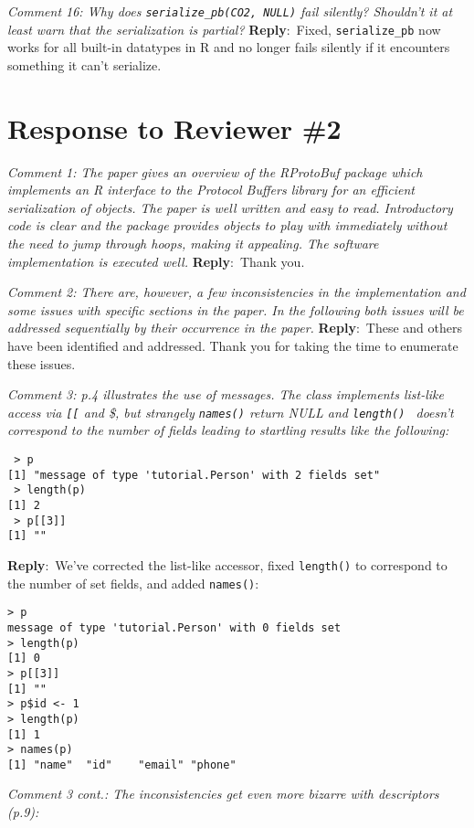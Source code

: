 \documentclass[10pt]{article}
\newcommand{\pointRaised}[2]{\smallskip %
  \textsl{{\fontseries{b}\selectfont #1}: #2}\newline}
\newcommand{\reply}[1]{\textbf{Reply}:\ #1 \smallskip } %
\begin{document}
\pointRaised{Comment 16}{Why does \texttt{serialize\_pb(CO2, NULL)} fail silently? Shouldn't it at least
   warn that the serialization is partial?}
\reply{Fixed, \texttt{serialize\_pb} now works for all built-in datatypes in R
  and no longer fails silently if it encounters something it can't serialize.}

\section*{Response to Reviewer \#2}

\pointRaised{Comment 1}{The paper gives an overview of the RProtoBuf package which implements an 
  R interface to the Protocol Buffers library for an efficient 
  serialization of objects. The paper is well written and easy to read. 
  Introductory code is clear and the package provides objects to play with 
  immediately without the need to jump through hoops, making it appealing. 
  The software implementation is executed well.}
\reply{Thank you.}

\pointRaised{Comment 2}{There are, however, a few inconsistencies in the implementation and some 
  issues with specific sections in the paper. In the following both issues 
  will be addressed sequentially by their occurrence in the paper.}
\reply{These and others have been identified and addressed.  Thank you
  for taking the time to enumerate these issues.}

\pointRaised{Comment 3}{p.4 illustrates the use of messages. The class implements list-like 
  access via \texttt{[[} and \$, but strangely \texttt{names()} return NULL and \texttt{length() }
  doesn't correspond to the number of fields leading to startling results like
the following:}

\begin{verbatim}
 > p
[1] "message of type 'tutorial.Person' with 2 fields set"
 > length(p)
[1] 2
 > p[[3]]
[1] ""
\end{verbatim}
\reply{We've corrected the list-like accessor, fixed \texttt{length()} to
  correspond to the number of set fields, and added \texttt{names()}:}
\begin{verbatim}
> p
message of type 'tutorial.Person' with 0 fields set
> length(p)
[1] 0
> p[[3]]
[1] ""
> p$id <- 1
> length(p)
[1] 1
> names(p)
[1] "name"  "id"    "email" "phone"
\end{verbatim}

\pointRaised{Comment 3 cont.}{The inconsistencies get even more bizarre with descriptors (p.9):}
\end{document}
